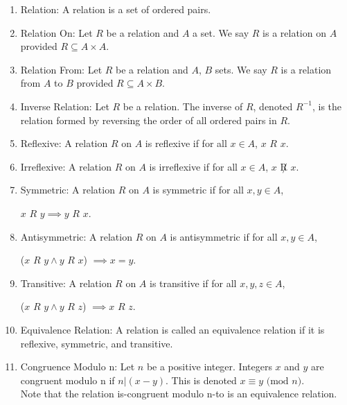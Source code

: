 \documentclass{article}
\begin{document}
	\begin{enumerate}
		
		\item Relation: A relation is a set of ordered pairs.
		
		\item Relation On: Let $R$ be a relation and $A$ a set.
		We say $R$ is a relation on $A$ provided $R\subseteq A\times A$.
		
		\item Relation From: Let $R$ be a relation and $A$, $B$ sets.
		We say $R$ is a relation from $A$ to $B$ provided $R\subseteq A\times B$.
		
		\item Inverse Relation: Let $R$ be a relation.
		The inverse of $R$, denoted $R^{-1}$, is the relation formed by reversing the order of all ordered pairs in $R$.
		
		\item Reflexive: A relation $R$ on $A$ is reflexive if for all $x\in A$, $x$ $R$ $x$.
		
		\item Irreflexive: A relation $R$ on $A$ is irreflexive if for all $x\in A$, $x$ $\not R$ $x$.
		
		\item Symmetric: A relation $R$ on $A$ is symmetric if for all $x,y\in A$,
		
		$x$ $R$ $y\implies y$ $R$ $x$.
		
		\item Antisymmetric: A relation $R$ on $A$ is antisymmetric if for all $x,y\in A$,
		
		($x$ $R$ $y\wedge y$ $R$ $x$) $\implies x=y$.
		
		\item Transitive: A relation $R$ on $A$ is transitive if for all $x,y,z\in A$,
		
		($x$ $R$ $y\wedge y$ $R$ $z$) $\implies x$ $R$ $z$.
		
		\item Equivalence Relation: A relation is called an equivalence relation if it is reflexive, symmetric, and transitive.
		
		\item Congruence Modulo n: Let $n$ be a positive integer.
		Integers $x$ and $y$ are congruent modulo n if $n|(x-y)$.
		This is denoted $x \equiv y$ $(\text{mod}$ $n)$.\\
		
		Note that the relation is-congruent modulo n-to is an equivalence relation.
		

\end{enumerate}
\end{document}

